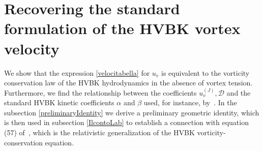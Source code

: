 \documentclass[preprints,article,accept,moreauthors,pdftex]{mdpi}
\begin{document}



\appendix

\section{Recovering the standard formulation of the HVBK vortex velocity}
\label{AAA}

We show that the expression \eqref{velocitabella} for $u_v$ is equivalent to the vorticity conservation law of the HVBK hydrodynamics in the absence of vortex tension. Furthermore, we find the relationship between the coefficients $u_v^{(J)},\mathcal{D}$ and the standard HVBK kinetic coefficients $\alpha$ and $\beta$ used, for instance, by~\citet{GusakovHVBK}.
In the subsection \ref{preliminaryIdentity} we derive a preliminary geometric identity, which is then used in subsection \ref{IlcontoLab} to establish a connection with equation (57) of~\cite{GusakovHVBK}, which is the relativistic generalization of the HVBK vorticity-conservation equation.
\end{document}
